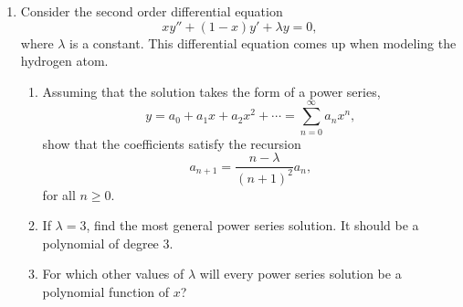 \documentclass[10pt,psamsfonts,reqno,oneside,letterpaper]{amsart}
\begin{document}
\begin{enumerate}
	\item  Consider the second order differential equation
	\[ xy'' + (1-x) y' + \lambda y = 0, \]
	where $\lambda$ is a constant.   This differential equation comes up when modeling the hydrogen atom. 
	\begin{enumerate}
		\item  Assuming that the solution takes the form of a power series,
		\[ y = a_0 + a_1 x + a_2 x^2 + \cdots  = \sum_{n=0}^{\infty} a_n x^n, \]
		show that the coefficients satisfy the recursion
		\[ a_{n+1} = \frac{n- \lambda}{(n+1)^2} a_n,\]
		for all $n \geq 0$.
		\item  If $\lambda = 3$, find the most general power series solution.  It should be a polynomial of degree $3$.
		\item  For which other values of $\lambda$ will every power series solution be a polynomial function of $x$?
	 \end{enumerate}
	
	

\end{enumerate}
\end{document}
